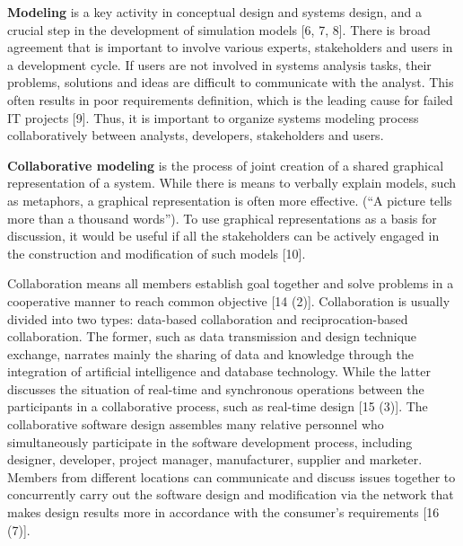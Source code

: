 
\textbf{Modeling} is a key activity in conceptual design and systems design, and a crucial step in the development of simulation models [6, 7, 8]. There is broad agreement that is important to involve various experts, stakeholders and users in a development cycle. If users are not involved in systems analysis tasks, their problems, solutions and ideas are difficult to communicate with the analyst. This often results in poor requirements definition, which is the leading cause for failed IT projects [9]. Thus, it is important to organize systems modeling process collaboratively between analysts, developers, stakeholders and users. 

\textbf{Collaborative modeling} is the process of joint creation of a shared graphical representation of a system. While there is means to verbally explain models, such as metaphors, a graphical representation is often more effective. (“A picture tells more than a thousand words”). To use graphical representations as a basis for discussion, it would be useful if all the stakeholders can be actively engaged in the construction and modification of such models [10]. 

Collaboration means all members establish goal together and solve problems in a cooperative manner to reach common objective [14 (2)]. Collaboration is usually divided into two types: data-based collaboration and reciprocation-based collaboration. The former, such as data transmission and design technique exchange, narrates mainly the sharing of data and knowledge through the integration of artificial intelligence and database technology. While the latter discusses the situation of real-time and synchronous operations between the participants in a collaborative process, such as real-time design [15 (3)]. The collaborative software design assembles many relative personnel who simultaneously participate in the software development process, including designer, developer, project manager, manufacturer, supplier and marketer. Members from different locations can communicate and discuss issues together to concurrently carry out the software design and modification via the network that makes design results more in accordance with the consumer’s requirements [16 (7)].

